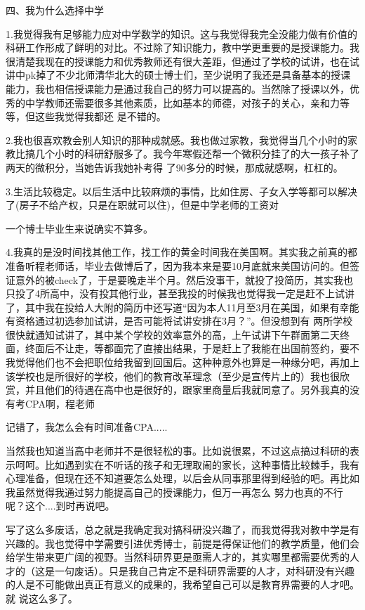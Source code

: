 \documentclass{article}
\begin{document}
四、我为什么选择中学 

\newpage

1.我觉得我有足够能力应对中学数学的知识。这与我觉得我完全没能力做有价值的科研工作形成了鲜明的对比。不过除了知识能力，教中学更重要的是授课能力。我很清楚我现在的授课能力和优秀教师还有很大差距，但通过了学校的试讲，也在试讲中pk掉了不少北师清华北大的硕士博士们，至少说明了我还是具备基本的授课能力，我也相信授课能力是通过我自己的努力可以提高的。当然除了授课以外，优秀的中学教师还需要很多其他素质，比如基本的师德，对孩子的关心，亲和力等等，但这些我觉得我都还
是不错的。 

2.我也很喜欢教会别人知识的那种成就感。我也做过家教，我觉得当几个小时的家教比搞几个小时的科研舒服多了。我今年寒假还帮一个微积分挂了的大一孩子补了两天的微积分，当她告诉我她补考得
了90多分的时候，那成就感啊，杠杠的。 

3.生活比较稳定。以后生活中比较麻烦的事情，比如住房、子女入学等都可以解决了(房子不给产权，只是在职就可以住)，但是中学老师的工资对
\newpage

一个博士毕业生来说确实不算多。 

4.我真的是没时间找其他工作，找工作的黄金时间我在美国啊。其实我之前真的都准备听程老师话，毕业去做博后了，因为我本来是要10月底就来美国访问的。但签证意外的被check了，于是要晚走半个月。然后没事干，就投了投简历，其实我也只投了4所高中，没有投其他行业，甚至我投的时候我也觉得我一定是赶不上试讲了，其中我在投给人大附的简历中还写道“因为本人11月至3月在美国，如果有幸能有资格通过初选参加试讲，是否可能将试讲安排在3月？”。但没想到有 两所学校很快就通知试讲了，其中某个学校的效率意外的高，上午试讲下午群面第二天终面，终面后不让走，等都面完了直接出结果，于是赶上了我能在出国前签约，要不我觉得他们也不会把职位给我留到回国后。这种种意外也算是一种缘分吧，再加上该学校也是所很好的学校，他们的教育改革理念（至少是宣传片上的）我也很欣赏，并且他们的待遇在高中也是很好的，跟家里商量后我就同意了。另外我真的没有考CPA啊，程老师

\newpage
记错了，我怎么会有时间准备CPA..... 

当然我也知道当高中老师并不是很轻松的事。比如说很累，不过这点搞过科研的表示呵呵。比如遇到实在不听话的孩子和无理取闹的家长，这种事情比较棘手，我有心理准备，但现在还不知道要怎么处理，以后会从同事那里得到经验的吧。再比如我虽然觉得我通过努力能提高自己的授课能力，但万一再怎么
努力也真的不行呢？这个....到时再说吧。 

写了这么多废话，总之就是我确定我对搞科研没兴趣了，而我觉得我对教中学是有兴趣的。我也觉得中学需要引进优秀博士，前提是得保证他们的教学质量，他们会给学生带来更广阔的视野。当然科研界更是亟需人才的，其实哪里都需要优秀的人才的（这是一句废话）。只是我自己肯定不是科研界需要的人才，对科研没有兴趣的人是不可能做出真正有意义的成果的，我希望自己可以是教育界需要的人才吧。就
说这么多了。 
\end{document}
